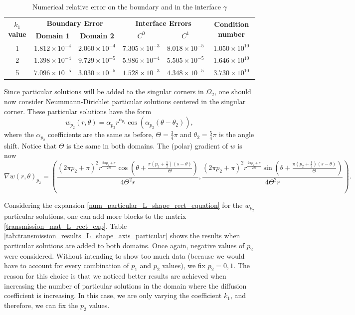 \begin{table}[!htbp]
    \centering
    \begin{tabular}{cccccc}
      \toprule
      \multirow{2}{*}{\textbf{\(k_1\) value}} & \multicolumn{2}{c}{\textbf{Boundary Error}} & \multicolumn{2}{c}{\textbf{Interface Errors}} & \multirow{2}{*}{\textbf{Condition number}} \\
      \cmidrule(lr){2-3} \cmidrule(lr){4-5}
      & \textbf{Domain 1} & \textbf{Domain 2} & \textbf{\(C^0\)} & \textbf{\(C^1\)} & \\
      \midrule
      1 & $1.812\times10^{-4}$ & $2.060\times10^{-4}$ & $7.305\times10^{-3}$ & $8.018\times10^{-5}$ & $1.050\times 10^{10}$ \\
      2 & $1.398\times10^{-4}$ & $9.729\times10^{-5}$ & $5.986\times10^{-4}$ & $5.505\times10^{-5}$ & $1.646\times 10^{10}$ \\
      5 & $7.096\times10^{-5}$ & $3.030\times10^{-5}$ & $1.528\times10^{-3}$ & $4.348\times10^{-5}$ & $3.730\times 10^{10}$ \\
      \bottomrule
    \end{tabular}
    \caption{Numerical relative error on the boundary and in the interface \(\gamma\)}
    \label{tab:transmission_results_L_shape_axis}
\end{table}

Since particular solutions will be added to the singular corners in \(\Omega_2\), one should now consider Neummann-Dirichlet particular solutions centered in the singular corner. These particular solutions have the form
\[
    w_{p_2}(r,\theta) = \alpha_{p_2} r^{\alpha_{p_2}}\cos(\alpha_{p_2}(\theta-\theta_2)),
\]
where the \(\alpha_{p_2}\) coefficients are the same as before, \(\Theta = \frac{3}{4}\pi\) and \(\theta_2=\frac{5}{4}\pi\) is the angle shift. Notice that \(\Theta\) is the same in both domains. The (polar) gradient of \(w\) is now
\begin{equation*}
    \nabla w(r,\theta)_{p_2} = \left(\frac{(2 \pi  {p_2}+\pi )^2 r^{\frac{2 \pi  {p_2}+\pi }{2 \Theta }} \cos \left(\theta +\frac{\pi  \left({p_2}+\frac{1}{2}\right) (s-\theta )}{\Theta }\right)}{4 \Theta ^2 r},\frac{(2 \pi  {p_2}+\pi )^2 r^{\frac{2 \pi  {p_2}+\pi }{2 \Theta }} \sin \left(\theta +\frac{\pi  \left({p_2}+\frac{1}{2}\right) (s-\theta )}{\Theta }\right)}{4 \Theta ^2 r}\right).
\end{equation*}

Considering the expansion \eqref{num_particular_L_shape_rect_equation} for the \(w_{p_2}\) particular solutions, one can add more blocks to the matrix \eqref{transmission_mat_L_rect_exp}. Table \ref{tab:transmission_results_L_shape_axis_particular} shows the results when particular solutions are added to both domains. Once again, negative values of \(p_2\) were considered. Without intending to show too much data (because we would have to account for every combination of \(p_1\) and \(p_2\) values), we fix \(p_2=0, 1\). The reason for this choice is that we noticed better results are achieved when increasing the number of particular solutions in the domain where the diffusion coefficient is increasing. In this case, we are only varying the coefficient \(k_1\), and therefore, we can fix the \(p_2\) values.


